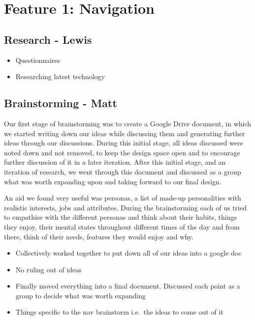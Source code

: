\documentclass{article}
\begin{document}
%
%
\section{Feature 1: Navigation}\label{sec:nav}

\subsection{Research - Lewis}\label{ssec:nav-research}
  \begin{itemize}
    \item Questionnaires
    \item Researching latest technology
  \end{itemize}

\subsection{Brainstorming - Matt}\label{ssec:nav-brainstorming}
Our first stage of brainstorming was to create a Google Drive document, in which we started writing down our ideas while discussing them and generating further ideas through our discussions. During this initial stage, all ideas discussed were noted down and not removed, to keep the design space open and to encourage further discussion of it in a later iteration. After this initial stage, and an iteration of research, we went through this document and discussed as a group what was worth expanding upon and taking forward to our final design.

An aid we found very useful was personas, a list of made-up personalities with realistic interests, jobs and attributes. During the brainstorming each of us tried to empathise with the different personas and think about their habits, things they enjoy, their mental states throughout different times of the day and from there, think of their needs, features they would enjoy and why.
	\begin{itemize}
		\item Collectively worked together to put down all of our ideas into a google doc
		\item No ruling out of ideas
		\item Finally moved everything into a final document. Discussed each point as a group to decide what was worth expanding
        \item Things specific to the nav brainstorm i.e.\ the ideas to come out of it
	\end{itemize}
\end{document}
